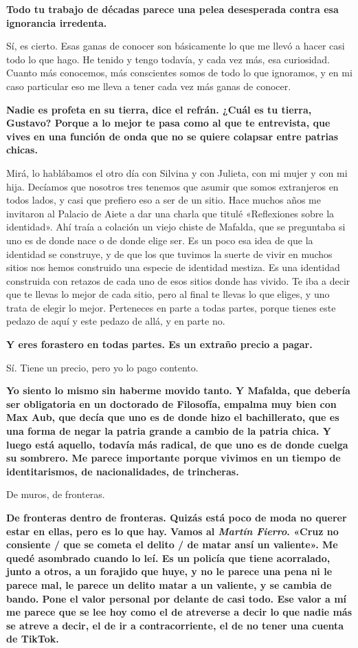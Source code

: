 \documentclass[11pt,a4paper]{article}
\newcommand{\preg}[1]{\textbf{#1}}
\begin{document}
\preg{Todo tu trabajo de décadas parece una pelea desesperada contra esa ignorancia irredenta.}

Sí, es cierto. Esas ganas de conocer son básicamente lo que me llevó a hacer casi todo lo que hago. He tenido y tengo todavía, y cada vez más, esa curiosidad. Cuanto más conocemos, más conscientes somos de todo lo que ignoramos, y en mi caso particular eso me lleva a tener cada vez más ganas de conocer.

\preg{Nadie es profeta en su tierra, dice el refrán. ¿Cuál es tu tierra, Gustavo? Porque a lo mejor te pasa como al que te entrevista, que vives en una función de onda que no se quiere colapsar entre patrias chicas.}

Mirá, lo hablábamos el otro día con Silvina y con Julieta, con mi mujer y con mi hija. Decíamos que nosotros tres tenemos que asumir que somos extranjeros en todos lados, y casi que prefiero eso a ser de un sitio. Hace muchos años me invitaron al Palacio de Aiete a dar una charla que titulé «Reflexiones sobre la identidad». Ahí traía a colación un viejo chiste de Mafalda, que se preguntaba si uno es de donde nace o de donde elige ser. Es un poco esa idea de que la identidad se construye, y de que los que tuvimos la suerte de vivir en muchos sitios nos hemos construido una especie de identidad mestiza. Es una identidad construida con retazos de cada uno de esos sitios donde has vivido. Te iba a decir que te llevas lo mejor de cada sitio, pero al final te llevas lo que eliges, y uno trata de elegir lo mejor. Perteneces en parte a todas partes, porque tienes este pedazo de aquí y este pedazo de allá, y en parte no.

\preg{Y eres forastero en todas partes. Es un extraño precio a pagar.}

Sí. Tiene un precio, pero yo lo pago contento.

\preg{Yo siento lo mismo sin haberme movido tanto. Y Mafalda, que debería ser obligatoria en un doctorado de Filosofía, empalma muy bien con Max Aub, que decía que uno es de donde hizo el bachillerato, que es una forma de negar la patria grande a cambio de la patria chica. Y luego está aquello, todavía más radical, de que uno es de donde cuelga su sombrero. Me parece importante porque vivimos en un tiempo de identitarismos, de nacionalidades, de trincheras.}

De muros, de fronteras.

\preg{De fronteras dentro de fronteras. Quizás está poco de moda no querer estar en ellas, pero es lo que hay. Vamos al \emph{Martín Fierro}. «Cruz no consiente / que se cometa el delito / de matar ansí un valiente». Me quedé asombrado cuando lo leí. Es un policía que tiene acorralado, junto a otros, a un forajido que huye, y no le parece una pena ni le parece mal, le parece un delito matar a un valiente, y se cambia de bando. Pone el valor personal por delante de casi todo. Ese valor a mí me parece que se lee hoy como el de atreverse a decir lo que nadie más se atreve a decir, el de ir a contracorriente, el de no tener una cuenta de TikTok.}
\end{document}
